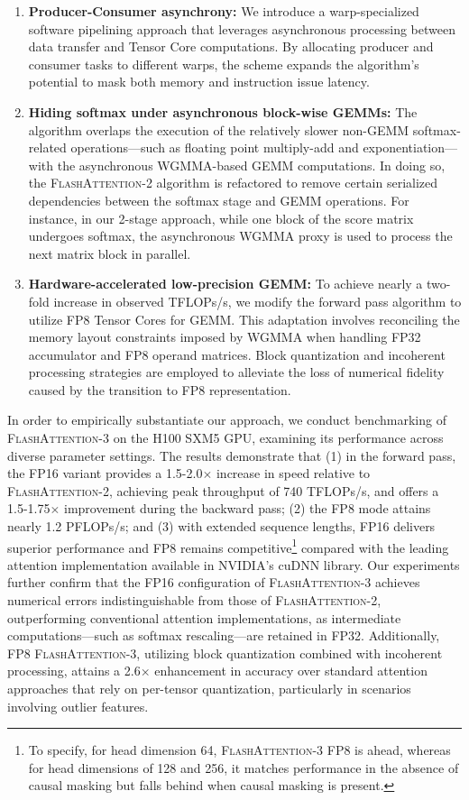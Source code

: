 \begin{enumerate}

\item \textbf{Producer-Consumer asynchrony:} We introduce a warp-specialized software pipelining approach that leverages asynchronous processing between data transfer and Tensor Core computations. By allocating producer and consumer tasks to different warps, the scheme expands the algorithm's potential to mask both memory and instruction issue latency.
\item \textbf{Hiding softmax under asynchronous block-wise GEMMs:} The algorithm overlaps the execution of the relatively slower non-GEMM softmax-related operations—such as floating point multiply-add and exponentiation—with the asynchronous WGMMA-based GEMM computations. In doing so, the \textsc{FlashAttention-2} algorithm is refactored to remove certain serialized dependencies between the softmax stage and GEMM operations. For instance, in our 2-stage approach, while one block of the score matrix undergoes softmax, the asynchronous WGMMA proxy is used to process the next matrix block in parallel.
\item \textbf{Hardware-accelerated low-precision GEMM:} To achieve nearly a two-fold increase in observed TFLOPs/s, we modify the forward pass algorithm to utilize FP8 Tensor Cores for GEMM. This adaptation involves reconciling the memory layout constraints imposed by WGMMA when handling FP32 accumulator and FP8 operand matrices. Block quantization and incoherent processing strategies are employed to alleviate the loss of numerical fidelity caused by the transition to FP8 representation.
\end{enumerate}

In order to empirically substantiate our approach, we conduct benchmarking of \textsc{FlashAttention-3} on the H100 SXM5 GPU, examining its performance across diverse parameter settings. The results demonstrate that (1) in the forward pass, the FP16 variant provides a 1.5-2.0$\times$ increase in speed relative to \textsc{FlashAttention-2}, achieving peak throughput of 740 TFLOPs/s, and offers a 1.5-1.75$\times$ improvement during the backward pass; (2) the FP8 mode attains nearly 1.2 PFLOPs/s; and (3) with extended sequence lengths, FP16 delivers superior performance and FP8 remains competitive\footnote{To specify, for head dimension 64, \textsc{FlashAttention-3} FP8 is ahead, whereas for head dimensions of 128 and 256, it matches performance in the absence of causal masking but falls behind when causal masking is present.} compared with the leading attention implementation available in NVIDIA’s cuDNN library. Our experiments further confirm that the FP16 configuration of \textsc{FlashAttention-3} achieves numerical errors indistinguishable from those of \textsc{FlashAttention-2}, outperforming conventional attention implementations, as intermediate computations—such as softmax rescaling—are retained in FP32. Additionally, FP8 \textsc{FlashAttention-3}, utilizing block quantization combined with incoherent processing, attains a 2.6$\times$ enhancement in accuracy over standard attention approaches that rely on per-tensor quantization, particularly in scenarios involving outlier features.

